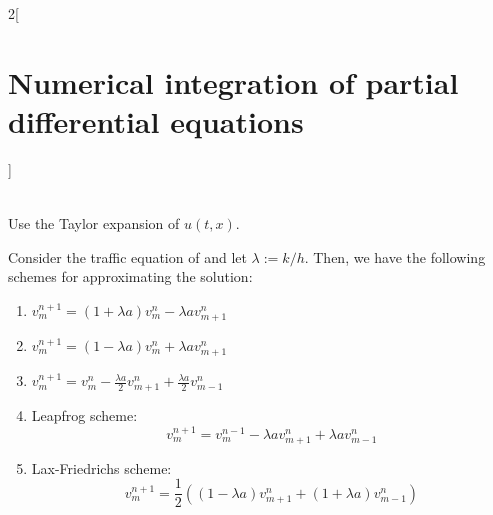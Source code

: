 \documentclass[../../../main_math.tex]{subfiles}
\begin{document}
\begin{multicols}{2}[\section{Numerical integration of partial differential equations}]
\begin{proposition}
\begin{enumerate}
\begin{equation}
\begin{split}
              \end{split}
            \end{equation}
    \end{enumerate}
  \end{proposition}
  \begin{sproof}
    Use the Taylor expansion of $u(t,x)$.
  \end{sproof}
  \begin{corollary}
    Consider the traffic equation of  and let $\lambda:=k/h$. Then, we have the following schemes for approximating the solution:
    \begin{enumerate}
      \item $\displaystyle v_m^{n+1}=(1+\lambda a)v_m^n-\lambda av_{m+1}^n$
      \item $\displaystyle v_m^{n+1}=(1-\lambda a)v_m^n+\lambda av_{m+1}^n$
      \item $\displaystyle v_m^{n+1}=v_m^n-\frac{\lambda a}{2}v_{m+1}^n+\frac{\lambda a}{2}v_{m-1}^n$
      \item Leapfrog scheme: $$v_m^{n+1}=v_m^{n-1}-\lambda av_{m+1}^n+\lambda av_{m-1}^n$$
      \item Lax-Friedrichs scheme: $$v_m^{n+1}=\frac{1}{2}\left((1-\lambda a)v_{m+1}^n+(1+\lambda a)v_{m-1}^n\right)$$
    \end{enumerate}
  \end{corollary}
\end{multicols}
\end{document}
